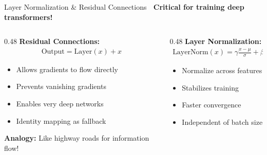 \documentclass[aspectratio=169]{beamer}
\begin{document}
\begin{frame}[shrink=10]{Layer Normalization \& Residual Connections 🔗}
\textbf{Critical for training deep transformers!}

\vspace{1em}

\begin{columns}[T]
\begin{column}{0.48\textwidth}
\textbf{Residual Connections:}
\begin{align*}
\text{Output} = \text{Layer}(x) + x
\end{align*}

\begin{itemize}\setlength{\itemsep}{0pt}
    \item Allows gradients to flow directly
    \item Prevents vanishing gradients
    \item Enables very deep networks
    \item Identity mapping as fallback
\end{itemize}

\vspace{0.5em}

\textbf{Analogy:}
Like highway roads for information flow!
\end{column}

\begin{column}{0.48\textwidth}
\textbf{Layer Normalization:}
\begin{align*}
\text{LayerNorm}(x) = \gamma \frac{x - \mu}{\sigma} + \beta
\end{align*}

\begin{itemize}\setlength{\itemsep}{0pt}
    \item Normalize across features
    \item Stabilizes training
    \item Faster convergence
    \item Independent of batch size
\end{itemize}

\vspace{0.5em}

\begin{center}
\end{center}
\end{column}
\end{columns}
\end{frame}
\end{document}
